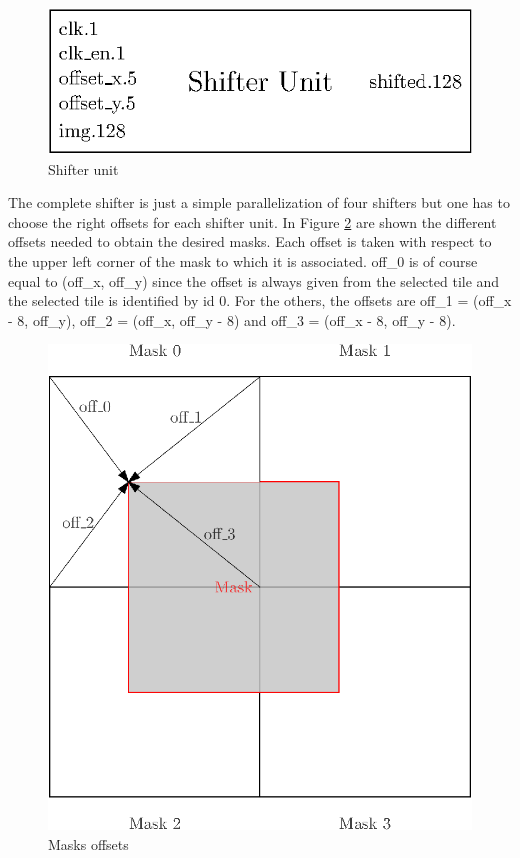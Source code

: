 \begin{figure}[H]
    \centering
    \includegraphics[scale=0.8]{Chapter4-GPU_CLKU/res/shifter_unit}
    \caption{Shifter unit}
    \label{fig:gpu/shifter_unit}
\end{figure}

The complete shifter is just a simple parallelization of four shifters but one has to choose the right 
offsets for each shifter unit. In Figure \ref{fig:gpu/shifter_offsets} are shown
the different offsets needed to obtain the desired masks. Each offset is taken with respect to the 
upper left corner of the mask to which it is associated. off\_0 is of course equal to 
(off\_x, off\_y) since the offset is always given from the selected tile and the selected tile is 
identified by id 0. For the others, the offsets are off\_1 = (off\_x - 8, off\_y), off\_2 = 
(off\_x, off\_y - 8) and off\_3 = (off\_x - 8, off\_y - 8).

\begin{figure}[H]
    \centering
    \includegraphics[scale=1.0]{Chapter4-GPU_CLKU/res/shifter_offsets}
    \caption{Masks offsets}
    \label{fig:gpu/shifter_offsets}
\end{figure}

